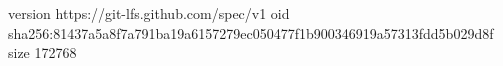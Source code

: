 version https://git-lfs.github.com/spec/v1
oid sha256:81437a5a8f7a791ba19a6157279ec050477f1b900346919a57313fdd5b029d8f
size 172768
